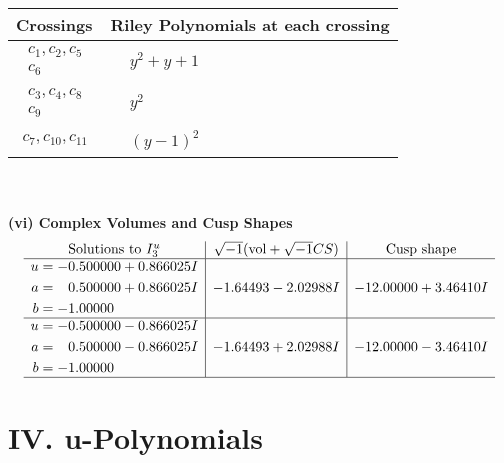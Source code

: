 \documentclass[1p]{elsarticle_modified}
\theoremstyle{definition}
\newcommand{\I}{\sqrt{-1}}
\begin{document}
\begin{tabular}{m{50pt}|m{274pt}}
Crossings & \hspace{64pt}Riley Polynomials at each crossing \\
\hline $$\begin{aligned}c_{1},c_{2},c_{5}\\c_{6}\end{aligned}$$&$\begin{aligned}
&y^2+y+1
\end{aligned}$\\
\hline $$\begin{aligned}c_{3},c_{4},c_{8}\\c_{9}\end{aligned}$$&$\begin{aligned}
&y^2
\end{aligned}$\\
\hline $$\begin{aligned}c_{7},c_{10},c_{11}\end{aligned}$$&$\begin{aligned}
&(y-1)^2
\end{aligned}$\\
\hline
\end{tabular}\\~\\
\newpage\flushleft \textbf{(vi) Complex Volumes and Cusp Shapes}
$$\begin{array}{c|c|c}  
\text{Solutions to }I^u_{3}& \I (\text{vol} + \sqrt{-1}CS) & \text{Cusp shape}\\
 \hline 
\begin{aligned}
u &= -0.500000 + 0.866025 I \\
a &= \phantom{-}0.500000 + 0.866025 I \\
b &= -1.00000\phantom{ +0.000000I}\end{aligned}
 & -1.64493 - 2.02988 I & -12.00000 + 3.46410 I \\ \hline\begin{aligned}
u &= -0.500000 - 0.866025 I \\
a &= \phantom{-}0.500000 - 0.866025 I \\
b &= -1.00000\phantom{ +0.000000I}\end{aligned}
 & -1.64493 + 2.02988 I & -12.00000 - 3.46410 I\\
 \hline 
 \end{array}$$\newpage
\newpage\renewcommand{\arraystretch}{1}
\centering \section*{ IV. u-Polynomials}
\end{document}

